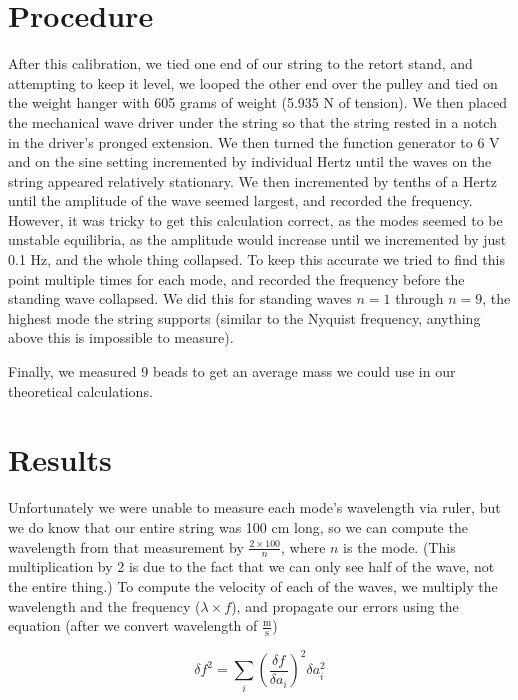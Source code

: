 \documentclass[12pt,letterpaper]{article}
\begin{document}
\section{Procedure}

After this calibration, we tied one end of our string to the retort stand, and attempting to keep it level, we looped the other end over the pulley and tied on the weight hanger with 605 grams of weight (5.935 N of tension). We then placed the mechanical wave driver under the string so that the string rested in a notch in the driver's pronged extension. We then turned the function generator to 6 V and on the sine setting incremented by individual Hertz until the waves on the string appeared relatively stationary. We then incremented by tenths of a Hertz until the amplitude of the wave seemed largest, and recorded the frequency. However, it was tricky to get this calculation correct, as the modes seemed to be unstable equilibria, as the amplitude would increase until we incremented by just 0.1 Hz, and the whole thing collapsed. To keep this accurate we tried to find this point multiple times for each mode, and recorded the frequency before the standing wave collapsed. We did this for standing waves $n=1$ through $n=9$, the highest mode the string supports (similar to the Nyquist frequency, anything above this is impossible to measure).

Finally, we measured 9 beads to get an average mass we could use in our theoretical calculations.

\section{Results}

Unfortunately we were unable to measure each mode's wavelength via ruler, but we do know that our entire string was 100 cm long, so we can compute the wavelength from that measurement by $\frac{2\times100}{n}$, where $n$ is the mode. (This multiplication by 2 is due to the fact that we can only see half of the wave, not the entire thing.) To compute the velocity of each of the waves, we multiply the wavelength and the frequency ($\lambda \times f$), and propagate our errors using the equation (after we convert wavelength of $\frac{\text{m}}{\text{s}}$)

\begin{equation}
    \delta f^2=\sum_i \left(\frac{\delta f}{\delta a_i}\right)^2\delta a_i^2
\end{equation}
\end{document}
